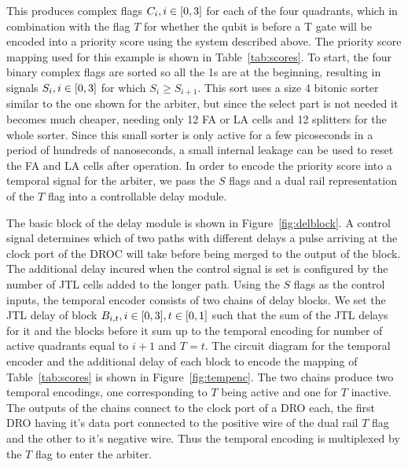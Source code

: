\documentclass[conference]{IEEEtran}
\begin{document}
This produces complex flags $C_i, i \in \interval{0}{3}$ for each of the four quadrants, which in combination with the flag $T$ for whether the qubit is before a T gate will be encoded into a priority score using the system described above.
The priority score mapping used for this example is shown in Table~\ref{tab:scores}.
To start, the four binary complex flags are sorted so all the 1s are at the beginning, resulting in signals $S_i, i \in \interval{0}{3}$ for which $S_{i} \ge S_{i+1}$.
This sort uses a size 4 bitonic sorter similar to the one shown for the arbiter, but since the select part is not needed it becomes much cheaper, needing only 12 FA or LA cells and 12 splitters for the whole sorter.
Since this small sorter is only active for a few picoseconds in a period of hundreds of nanoseconds, a small internal leakage can be used to reset the FA and LA cells after operation.
In order to encode the priority score into a temporal signal for the arbiter, we pass the $S$ flags and a dual rail representation of the $T$ flag into a controllable delay module.

The basic block of the delay module is shown in Figure~\ref{fig:delblock}.
A control signal determines which of two paths with different delays a pulse arriving at the clock port of the DROC will take before being merged to the output of the block.
The additional delay incured when the control signal is set is configured by the number of JTL cells added to the longer path.
Using the $S$ flags as the control inputs, the temporal encoder consists of two chains of delay blocks.
We set the JTL delay of block $B_{i,t}, i \in \interval{0}{3}, t \in \interval{0}{1}$ such that the sum of the JTL delays for it and the blocks before it sum up to the temporal encoding for number of active quadrants equal to $i+1$ and $T = t$.
The circuit diagram for the temporal encoder and the additional delay of each block to encode the mapping of Table~\ref{tab:scores} is shown in Figure~\ref{fig:tempenc}.
The two chains produce two temporal encodings, one corresponding to $T$ being active and one for $T$ inactive.
The outputs of the chains connect to the clock port of a DRO each, the first DRO having it's data port connected to the positive wire of the dual rail $T$ flag and the other to it's negative wire.
Thus the temporal encoding is multiplexed by the $T$ flag to enter the arbiter.
\end{document}
